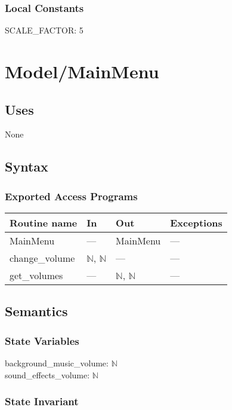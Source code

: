 \documentclass[12pt]{article}
\begin{document}
\subsubsection* {Local Constants}
SCALE\_FACTOR: 5

\newpage
\section*{Model/MainMenu}

\subsection* {Uses}
None

\subsection* {Syntax}

\subsubsection* {Exported Access Programs}

\begin{tabular}{| l | l | l | l |}
\hline
\textbf{Routine name} & \textbf{In} & \textbf{Out} & \textbf{Exceptions}\\
\hline
    MainMenu & --- & MainMenu & ---\\
\hline
    change\_volume & $\mathbb{N}$, $\mathbb{N}$ & --- & ---\\
\hline
    get\_volumes & --- & $\mathbb{N}$, $\mathbb{N}$ & ---\\
\hline
\end{tabular}

\subsection* {Semantics}

\subsubsection* {State Variables}

background\_music\_volume: $\mathbb{N}$\\
sound\_effects\_volume: $\mathbb{N}$

\subsubsection* {State Invariant}
\end{document}
